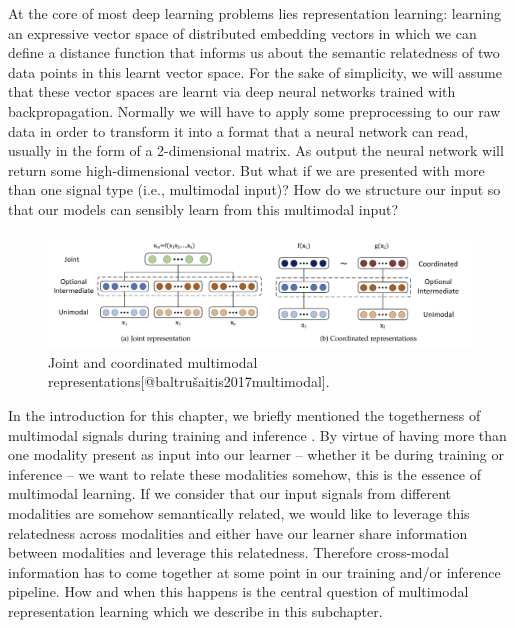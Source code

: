 \documentclass[
]{krantz}
\begin{document}
At the core of most deep learning problems lies representation learning: learning an expressive vector space of distributed embedding vectors in which we can define a distance function that informs us about the semantic relatedness of two data points in this learnt vector space. For the sake of simplicity, we will assume that these vector spaces are learnt via deep neural networks trained with backpropagation. Normally we will have to apply some preprocessing to our raw data in order to transform it into a format that a neural network can read, usually in the form of a 2-dimensional matrix. As output the neural network will return some high-dimensional vector. But what if we are presented with more than one signal type (i.e., multimodal input)? How do we structure our input so that our models can sensibly learn from this multimodal input?

\begin{figure}

{\centering \includegraphics[width=1\linewidth]{figures/03-01/joint-coordinated} 

}

\caption{Joint and coordinated multimodal representations[@baltrušaitis2017multimodal].}\label{fig:joint-coordinated}
\end{figure}

In the introduction for this chapter, we briefly mentioned the togetherness of multimodal signals during training and inference \citep{DBLP:journals/pami/BengioCV13}. By virtue of having more than one modality present as input into our learner -- whether it be during training or inference -- we want to relate these modalities somehow, this is the essence of multimodal learning. If we consider that our input signals from different modalities are somehow semantically related, we would like to leverage this relatedness across modalities and either have our learner share information between modalities and leverage this relatedness. Therefore cross-modal information has to come together at some point in our training and/or inference pipeline. How and when this happens is the central question of multimodal representation learning which we describe in this subchapter.
\end{document}
